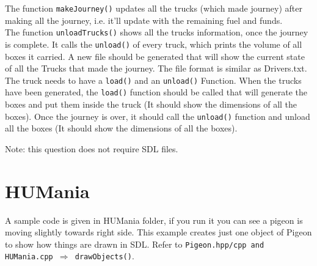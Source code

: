 \documentclass[a4paper,12pt]{article}
\begin{document}
\noindent The function \texttt{makeJourney()} updates all the trucks (which made journey) after making all the journey, i.e. it'll update with the remaining fuel and funds.\\

\noindent The function \texttt{unloadTrucks()} shows all the trucks information, once the journey is complete. It calls the \texttt{unload()} of every truck, which prints the volume of all boxes it carried. A new file  should be generated that will show the current state of all the Trucks that made the journey. The file format is similar as Drivers.txt.\smallskip\\	



\noindent The truck needs to have a \texttt{load()} and an \texttt{unload()} Function. When the trucks have been generated, the \texttt{load()} function should be called that will generate the boxes and put them inside the truck (It should show the dimensions of all the boxes). Once the journey is over, it should call the \texttt{unload()} function and unload all the boxes (It should show the dimensions of all the boxes).

Note: this question does not require SDL files.

\section{HUMania}

A sample code is given in HUMania folder, if you run it you can see a pigeon is moving slightly towards right side. This example creates just one object of Pigeon to show how things are drawn in SDL. Refer to \texttt{Pigeon.hpp/cpp and HUMania.cpp $ \Rightarrow $ drawObjects()}.
\end{document}
